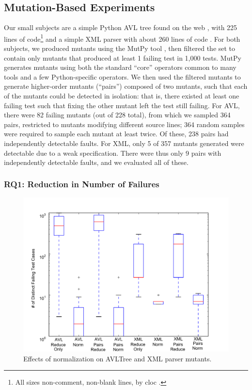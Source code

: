 \subsection{Mutation-Based Experiments}


Our small subjects are a
simple Python AVL tree found on the web
\cite{avltree}, with 225 lines of code\footnote{All sizes non-comment,
  non-blank lines, by cloc \cite{cloc}.} and a
simple XML parser with about 260 lines of code \cite{myxml}.  For both
subjects, we produced mutants using the MutPy tool
\cite{mutpy}, then filtered the set to contain only mutants that produced
at least 1 failing test in 1,000 tests.  MutPy generates mutants using
both the standard ``core'' operators common to many tools \cite{mutant} and
a few Python-specific operators.  We then used the filtered
mutants to generate higher-order mutants (``pairs'') composed of two mutants,
such that each of the mutants could be detected in isolation:  that
is, there existed at least one failing test such that fixing the other
mutant left the test still failing.  For AVL, there were 82 failing
mutants (out of 228 total), from which we sampled 364 pairs, restricted to mutants modifying different source lines; 364 random samples
were required to sample each mutant at least twice.  Of these,
238 pairs had independently detectable faults.  For XML, only 5 of 357
mutants generated were detectable due to a weak specification.  There
were thus only 9 pairs with independently
detectable faults, and we evaluated all of these.

\subsubsection{RQ1: Reduction in Number of Failures}

\begin{figure}
\includegraphics[width=\columnwidth]{length}
\caption{Effects of normalization on AVLTree and XML parser mutants.}
\label{normeffect}
\end{figure}

